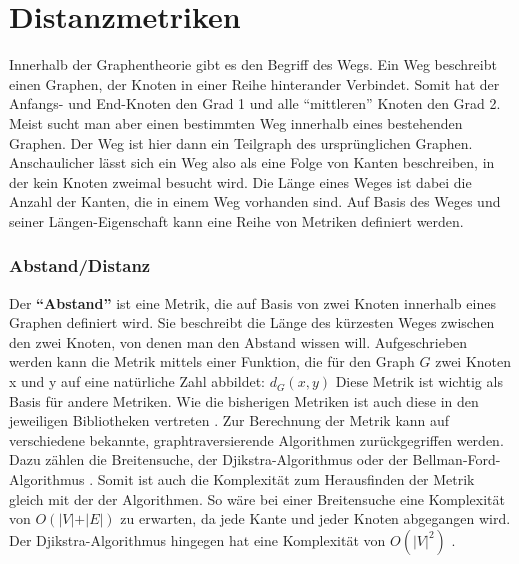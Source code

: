 \documentclass[a4paper,12pt,ngerman,chapterprefix=false,listof=totoc,bibliography=totoc]{scrreprt}
\begin{document}
\section{Distanzmetriken}
{
Innerhalb der Graphentheorie gibt es den Begriff des Wegs. Ein Weg beschreibt einen Graphen, der Knoten in einer Reihe hinterander Verbindet. Somit hat der Anfangs- und End-Knoten den Grad 1 und alle "`mittleren"' Knoten den Grad 2. Meist sucht man aber einen bestimmten Weg innerhalb eines bestehenden Graphen. Der Weg ist hier dann ein Teilgraph des ursprünglichen Graphen. Anschaulicher lässt sich ein Weg also als eine Folge von Kanten beschreiben, in der kein Knoten zweimal besucht wird. Die Länge eines Weges ist dabei die Anzahl der Kanten, die in einem Weg vorhanden sind. \cite{diestel_graphentheorie_2000} Auf Basis des Weges und seiner Längen-Eigenschaft kann eine Reihe von Metriken definiert werden.
}
\subsubsection*{Abstand/Distanz}
{
Der \textbf{"`Abstand"'} ist eine Metrik, die auf Basis von zwei Knoten innerhalb eines Graphen definiert wird. Sie beschreibt die Länge des kürzesten Weges zwischen den zwei Knoten, von denen man den Abstand wissen will. Aufgeschrieben werden kann die Metrik mittels einer Funktion, die für den Graph \(G\) zwei Knoten x und y auf eine natürliche Zahl abbildet: \(d_G (x,y)\) \cite{diestel_graphentheorie_2000} Diese Metrik ist wichtig als Basis für andere Metriken. Wie die bisherigen Metriken ist auch diese in den jeweiligen Bibliotheken vertreten \cite{sagemath_graph_2020,matlab_shortest_2020,wolfram_graph_2020}. Zur Berechnung der Metrik kann auf verschiedene bekannte, graphtraversierende Algorithmen zurückgegriffen werden. Dazu zählen die Breitensuche, der Djikstra-Algorithmus oder der Bellman-Ford-Algorithmus \cite{sagemath_graph_2020}. Somit ist auch die Komplexität zum Herausfinden der Metrik gleich mit der der Algorithmen. So wäre bei einer Breitensuche eine Komplexität von \(O(\vert V\vert +\vert E\vert)\) zu erwarten, da jede Kante und jeder Knoten abgegangen wird. Der Djikstra-Algorithmus hingegen hat eine Komplexität von \(O(\vert V\vert ^2)\) \cite{jungnickel_graphs_2013}.
}
\end{document}
